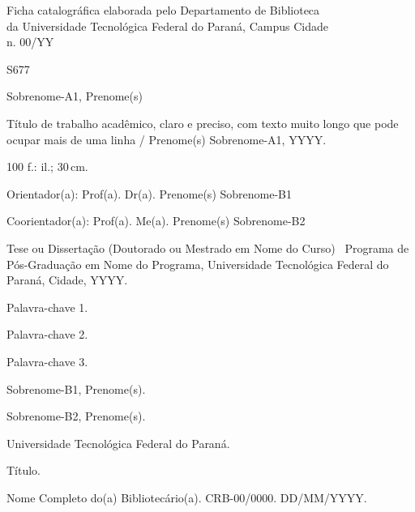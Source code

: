 \documentclass[a4paper, 12pt, twoside]{memoir}
\newcommand*{\UTFPRName}{Universidade Tecnológica Federal do Paraná}
\begin{document}
\begin{minipage}[t]{125mm}
Ficha catalográfica elaborada pelo Departamento de Biblioteca\\%
da \UTFPRName, Campus Cidade\\%
n. 00/YY
\end{minipage}

\vspace*{1ex}

\begin{boxedminipage}[t]{125mm}
\parbox[t]{10mm}{S677}%
\begin{minipage}[t]{\dimexpr105mm-2\fboxrule}
\setlength{\parindent}{5mm}
\setlength{\parskip}{2ex}
\noindent Sobrenome-A1, Prenome{(s)}%

Título de trabalho acadêmico, claro e preciso, com texto muito longo que pode ocupar mais de uma linha / Prenome{(s)} Sobrenome-A1, YYYY.%

\vspace*{-\parskip}

100 f{.}: il.; 30\,cm.

Orientador{(a)}: Prof{(a)}. Dr{(a)}. Prenome{(s)} Sobrenome-B1

\vspace*{-\parskip}

Coorientador{(a)}: Prof{(a)}. Me{(a)}. Prenome{(s)} Sobrenome-B2

Tese ou Dissertação (Doutorado ou Mestrado em Nome do Curso) \textemdash\ Programa de Pós-Graduação em Nome do Programa, \UTFPRName, Cidade, YYYY.%

\begin{enumerate*}[label = \arabic*.]%
\item Palavra-chave 1.
\item Palavra-chave 2.
\item Palavra-chave 3.
\end{enumerate*}
\begin{enumerate*}[label = \Roman*.]%
\item Sobrenome-B1, Prenome{(s)}. %
\item Sobrenome-B2, Prenome{(s)}. %
\item \UTFPRName.
\item Título.
\end{enumerate*}
\end{minipage}

\parbox{\dimexpr115mm-2\fboxrule}{}
\end{boxedminipage}

\vspace*{1ex}

\begin{minipage}[t]{125mm}
Nome Completo do{(a)} Bibliotecário{(a)}. CRB-00/0000. DD/MM/YYYY.%
\end{minipage}

\end{document}
